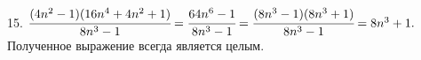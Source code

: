 15. $\cfrac{(4n^2-1)(16n^4+4n^2+1)}{8n^3-1}=\cfrac{64n^6-1}{8n^3-1}=\cfrac{(8n^3-1)(8n^3+1)}{8n^3-1}=8n^3+1.$ Полученное выражение всегда является целым.\\
